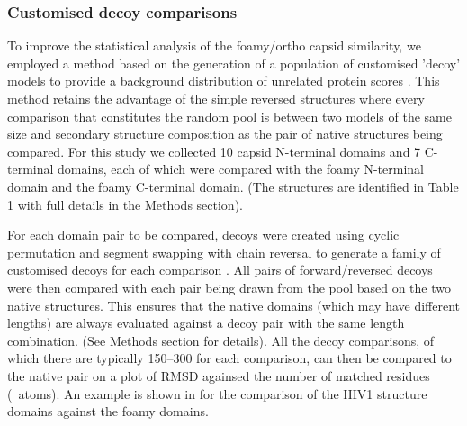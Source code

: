 \subsubsection{Customised decoy comparisons}

To improve the statistical analysis of the foamy/ortho capsid similarity, we employed a method
based on the generation of a population of customised 'decoy' models to provide a background distribution
of unrelated protein scores \cite{Taylor}.  This method retains the advantage of the simple
reversed structures where every comparison that constitutes the random pool is between two models
of the same size and secondary structure composition as the pair of native structures being compared.
For this study we collected 10 capsid N-terminal domains and 7 C-terminal domains, each of which 
were compared with the foamy N-terminal domain and the foamy C-terminal domain.
(The structures are identified in Table 1 with full details in the Methods section).

For each domain pair to be compared, decoys were created using cyclic permutation
and segment swapping with chain reversal to generate a family of customised decoys for each
comparison \cite{Taylor}.  All pairs of forward/reversed decoys were then compared with each pair being
drawn from the pool based on the two native structures.  This ensures that the native domains
(which may have different lengths) are always evaluated against a decoy pair with the same
length combination.   (See Methods section for details).   All the decoy comparisons, of which
there are typically 150--300 for each comparison,  can then be compared to the native pair on a
plot of RMSD againsed the number of matched residues (\CA\ atoms).   An example is shown in
 for the comparison of the HIV1 structure \cite{ian} domains against the foamy domains.
 

